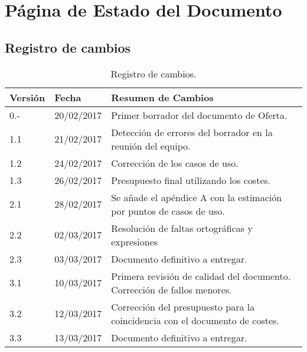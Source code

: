 \section{Página de Estado del Documento}

\subsection{Registro de cambios}
\begin{table}[htbp]
\begin{center}
\begin{tabular}{l l p{11cm} }
\textbf{Versión}&\textbf{Fecha}&\textbf{Resumen de Cambios}\\
\hline \hline
0.- & 20/02/2017 & Primer borrador del documento de Oferta.\\
\hline
1.1 & 21/02/2017 & Detección de errores del borrador en la reunión del equipo.\\
\hline
1.2 & 24/02/2017 & Corrección de los casos de uso.\\
\hline
1.3 & 26/02/2017 & Presupuesto final utilizando los costes.\\
\hline
2.1 & 28/02/2017 & Se añade el apéndice A con la estimación por puntos de casos de uso.\\
\hline
2.2 & 02/03/2017 & Resolución de faltas ortográficas y expresiones\\
\hline
2.3 & 03/03/2017 & Documento definitivo a entregar.\\
\hline
3.1 & 10/03/2017 & Primera revisión de calidad del documento. Corrección de fallos menores.\\
\hline
3.2 & 12/03/2017 & Corrección del presupuesto para la coincidencia con el documento de costes.\\
\hline
3.3 & 13/03/2017 & Documento definitivo a entregar.\\
\hline
\end{tabular}
\caption{Registro de cambios.}
\label{tabla:changeReg}
\end{center}
\end{table}

